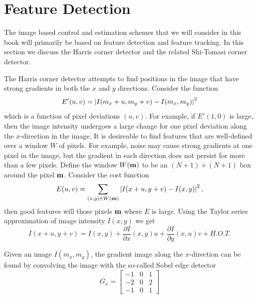 \section{Feature Detection}
\label{sec:feature_detection}


The image based control and estimation schemes that we will consider in this book will primarily be based on feature detection and feature tracking.  In this section we discuss the Harris corner detector and the related Shi-Tomasi corner detector. 
%
	
The Harris corner detector attempts to find positions in the image that have strong gradients in both the $x$ and $y$ directions. Consider the function
\[
E'(u,v) = \left|I(m_x + u, m_y+v) - I(m_x, m_y)\right|^2
\]
which is a function of pixel deviations $(u,v)$.  For example, if $E'(1,0)$ is large, then the image intensity undergoes a large change for one pixel deviation along the $x$-direction in the image.  
It is desireable to find features that are well-defined over a window $W$ of pixels.  For example, noise may cause strong gradients at one pixel in the image, but the gradient in each direction does not persist for more than a few pixels.  Define the window $W(\mathbf{m})$ to be an $(N+1)\times(N+1)$ box around the pixel $\mathbf{m}$.  Consider the cost function
\[
E(u,v) = \sum_{(x,y)\in W(\mathbf{m})} \left| I(x+u, y+v)-I(x,y) \right|^2,
\]
then good features will those pixels $\mathbf{m}$ where $E$ is large.
Using the Taylor series approximation of image intensity $I(x,y)$ we get
\begin{equation}\label{eq:image_gradient_1}
I(x+u, y+v) = I(x,y) + \frac{\partial I}{\partial x}(x,y)u + \frac{\partial I}{\partial y}(x,u) v + H.O.T.
\end{equation}

Given an image $I(m_x, m_y)$, the gradient image along the $x$-direction can be found by convolving the image with the so-called Sobel edge detector
\[
G_x = \left[ \begin{array}{c|c|c}
-1 & 0 & 1 \\\hline -2 & 0 & 2 \\\hline -1 & 0 & 1
\end{array} \right]
\]


